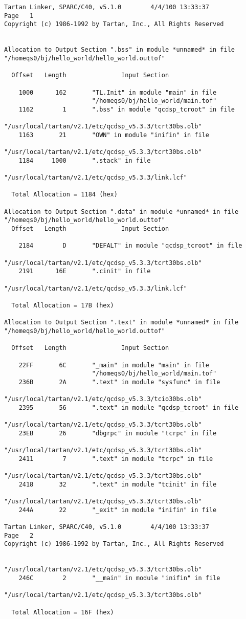 {\small
\begin{verbatim}
Tartan Linker, SPARC/C40, v5.1.0        4/4/100 13:33:37                Page   1
Copyright (c) 1986-1992 by Tartan, Inc., All Rights Reserved


Allocation to Output Section ".bss" in module *unnamed* in file
"/homeqs0/bj/hello_world/hello_world.outtof"

  Offset   Length               Input Section

    1000      162       "TL.Init" in module "main" in file
                        "/homeqs0/bj/hello_world/main.tof"
    1162        1       ".bss" in module "qcdsp_tcroot" in file
                        "/usr/local/tartan/v2.1/etc/qcdsp_v5.3.3/tcrt30bs.olb"
    1163       21       "OWN" in module "inifin" in file
                        "/usr/local/tartan/v2.1/etc/qcdsp_v5.3.3/tcrt30bs.olb"
    1184     1000       ".stack" in file
                        "/usr/local/tartan/v2.1/etc/qcdsp_v5.3.3/link.lcf"

  Total Allocation = 1184 (hex)

Allocation to Output Section ".data" in module *unnamed* in file
"/homeqs0/bj/hello_world/hello_world.outtof"
  Offset   Length               Input Section

    2184        D       "DEFALT" in module "qcdsp_tcroot" in file
                        "/usr/local/tartan/v2.1/etc/qcdsp_v5.3.3/tcrt30bs.olb"
    2191      16E       ".cinit" in file
                        "/usr/local/tartan/v2.1/etc/qcdsp_v5.3.3/link.lcf"

  Total Allocation = 17B (hex)

Allocation to Output Section ".text" in module *unnamed* in file
"/homeqs0/bj/hello_world/hello_world.outtof"

  Offset   Length               Input Section

    22FF       6C       "_main" in module "main" in file
                        "/homeqs0/bj/hello_world/main.tof"
    236B       2A       ".text" in module "sysfunc" in file
                        "/usr/local/tartan/v2.1/etc/qcdsp_v5.3.3/tcio30bs.olb"
    2395       56       ".text" in module "qcdsp_tcroot" in file
                        "/usr/local/tartan/v2.1/etc/qcdsp_v5.3.3/tcrt30bs.olb"
    23EB       26       "dbgrpc" in module "tcrpc" in file
                        "/usr/local/tartan/v2.1/etc/qcdsp_v5.3.3/tcrt30bs.olb"
    2411        7       ".text" in module "tcrpc" in file
                         "/usr/local/tartan/v2.1/etc/qcdsp_v5.3.3/tcrt30bs.olb"
    2418       32       ".text" in module "tcinit" in file
                        "/usr/local/tartan/v2.1/etc/qcdsp_v5.3.3/tcrt30bs.olb"
    244A       22       "_exit" in module "inifin" in file

Tartan Linker, SPARC/C40, v5.1.0        4/4/100 13:33:37                Page   2
Copyright (c) 1986-1992 by Tartan, Inc., All Rights Reserved

                        "/usr/local/tartan/v2.1/etc/qcdsp_v5.3.3/tcrt30bs.olb"
    246C        2       "__main" in module "inifin" in file
                        "/usr/local/tartan/v2.1/etc/qcdsp_v5.3.3/tcrt30bs.olb"

  Total Allocation = 16F (hex)
\end{verbatim}
}
